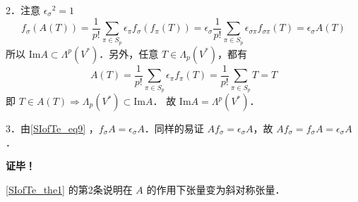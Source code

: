 2．注意 ${\epsilon_\sigma}^2=1$
\begin{equation}\label{SIofTe_eq9}
f_\sigma(A(T))=\frac{1}{p!}\sum_{\pi\in S_p}\epsilon_\pi f_\sigma(f_\pi(T))=\epsilon_\sigma\frac{1}{p!}\sum_{\pi\in S_p}\epsilon_{\sigma\pi} f_{\sigma\pi}(T)=\epsilon_\sigma A(T)
\end{equation}
 所以 $\mathrm{Im} A\subset\Lambda^p(V^*)$．另外，任意 $T\in\Lambda_p(V^*)$，都有
 \begin{equation}
 A(T)=\frac{1}{p!}\sum_{\pi\in S_p}\epsilon_\pi f_\pi(T)=\frac{1}{p!}\sum_{\pi\in S_p}T=T
 \end{equation}
 即 $T\in A(T)\Rightarrow\Lambda_p(V^*)\subset\mathrm{Im} A$．
 故 $\mathrm{Im} A=\Lambda^p(V^*)$．

3．由\autoref{SIofTe_eq9} ，$f_\sigma A=\epsilon_\sigma A$．同样的易证 $Af_\sigma=\epsilon_\sigma A$，故 $Af_\sigma=f_\sigma A=\epsilon_\sigma A$．

\textbf{证毕！}

\autoref{SIofTe_the1} 的第2条说明在 $A$ 的作用下张量变为斜对称张量．

